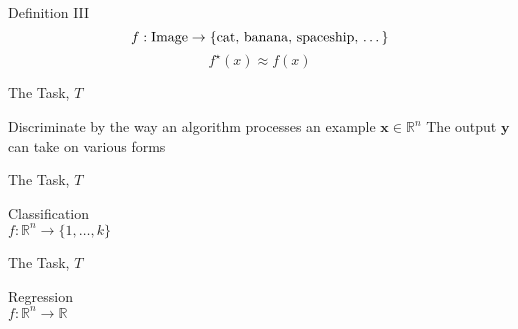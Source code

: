 \begin{slide}{Definition III}
  $$f: \text{Image} \rightarrow \{\text{cat, banana, spaceship, \dots}\}$$
  \vspace{0.5cm}
  \pause
  $$f^\star(x) \approx f(x)$$
\end{slide}

\begin{slide}{The Task, $T$}
\begin{itemize}
  \pitem Discriminate by the way an algorithm processes an example $\textbf{x} \in \mathbb{R}^n$
  \pitem The output $\textbf{y}$ can take on various forms
\end{itemize}
\end{slide}

\begin{slide}{The Task, $T$}
  \begin{center}
    {\Large
    Classification}\\
    \vspace{0.3cm}
    $f: \mathbb{R}^n \rightarrow \{1, \dots, k\}$
  \end{center}
\end{slide}

\begin{slide}{The Task, $T$}
  \begin{center}
    {\Large
    Regression}\\
    \vspace{0.3cm}
    $f: \mathbb{R}^n \rightarrow \mathbb{R}$
  \end{center}
\end{slide}

